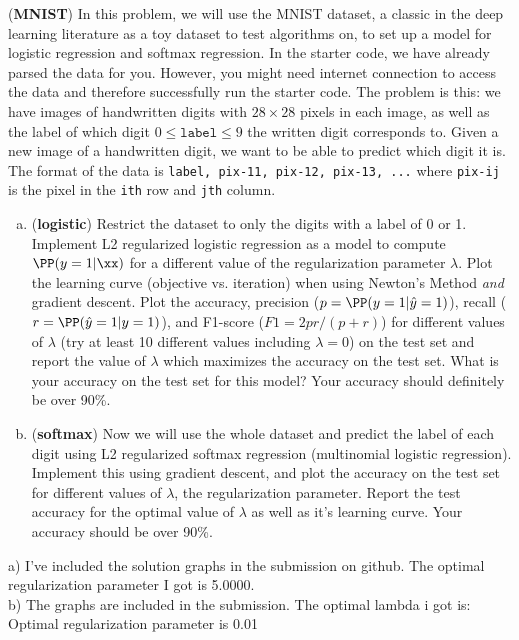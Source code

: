 \documentclass[12pt,letterpaper,fleqn]{hmcpset}
\begin{document}
\newpage

\begin{problem}[2]
(\textbf{MNIST}) 
In this problem, we will use the MNIST dataset, a classic in the deep learning literature as a toy dataset to test
algorithms on, to set up a model for logistic regression and softmax regression. In the starter code, we have already parsed the data for you. However, you might need internet connection to access the data and therefore successfully run the starter code.
\newline
\newline
The problem is this: we have images of handwritten
digits with $28\times 28$ pixels in each image, as well as the label of which digit $0 \leq \texttt{label} \leq 9$ the written
digit corresponds to. Given a new image of a handwritten digit, we want to be
able to predict which digit it is.
The format of the data is \texttt{label, pix-11, pix-12, pix-13, ...}
where \texttt{pix-ij} is the pixel in the \texttt{ith} row and \texttt{jth} column.
\newline
\begin{enumerate}[(a)]
    \item (\textbf{logistic}) Restrict the dataset to only the digits with a label
        of 0 or 1. Implement L2 regularized logistic regression as a model to compute
        $\PP(y=1|\xx)$ for a different value of the regularization parameter $\lambda$.
        Plot the learning curve (objective vs. iteration) when using Newton's Method
        \textit{and} gradient descent.
        Plot the accuracy, precision ($p = \PP(y=1 | \hat y=1)$), recall ($r = \PP(\hat y=1 | y=1)$),
        and F1-score ($F1 = 2pr / (p+r)$) for different values of $\lambda$ (try at least
        10 different values including $\lambda = 0$) on the test set and report the
        value of $\lambda$ which maximizes the accuracy on the test set. What is your
        accuracy on the test set for this model? Your accuracy should definitely be
        over 90\%.

    \item (\textbf{softmax}) Now we will use the whole dataset and predict the label
        of each digit using L2 regularized softmax regression (multinomial logistic
        regression). Implement this using gradient descent, and plot the accuracy
        on the test set for different values of $\lambda$, the regularization parameter.
        Report the test accuracy for the optimal value of $\lambda$ as well as it's
        learning curve. Your accuracy should be over 90\%.

\end{enumerate}
\end{problem}
\begin{solution}
a) I've included the solution graphs in the submission on github. The optimal regularization parameter I got is 5.0000. \\
b) The graphs are included in the submission. The optimal lambda i got is: Optimal regularization parameter is 0.01 \\
\end{solution}
\newpage
\end{document}
